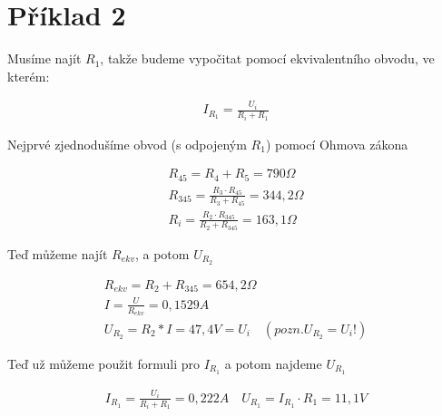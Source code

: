 \section{Příklad 2}

\begin{center}
	{Musíme najít $R_1$, takže budeme vypočitat pomocí ekvivalentního obvodu, ve kterém:}
\end{center}

\begin{align*}
	I_{R_1} = \frac{U_i}{R_i + R_1}
\end{align*}

\begin{center}
	{Nejprvé zjednodušíme obvod (s odpojeným $R_1$) pomocí Ohmova zákona}
\end{center}

\begin{align*}
	R_{45} = R_4 + R_5 = 790 \Omega \\
	R_{345} = \frac {R_3 \cdot R_{45}}{R_3 + R_{45}} = 344,2 \Omega \\
	R_i = \frac {R_2 \cdot R_{345}}{R_2 + R_{345}} = 163,1 \Omega 
\end{align*}

\begin{center}
	{Teď můžeme najít $R_{ekv}$, a potom $U_{R_2}$}
\end{center}

\begin{align*}
	R_{ekv} = R_2 + R_{345} = 654,2 \Omega \\
	I = \frac {U}{R_{ekv}} = 0,1529 A\\
	U_{R_2} = R_2 * I = 47,4 V = U_i \quad (pozn. U_{R_2} = U_i !)
\end{align*}

\begin{center}
	{Teď už můžeme použit formuli pro $I_{R_1}$ a potom najdeme $U_{R_1}$}
\end{center}

\begin{align*}
	I_{R_1} = \frac{U_i}{R_i + R_1} = 0,222 A \quad U_{R_1} = I_{R_1} \cdot R_1 = 11,1 V
\end{align*}